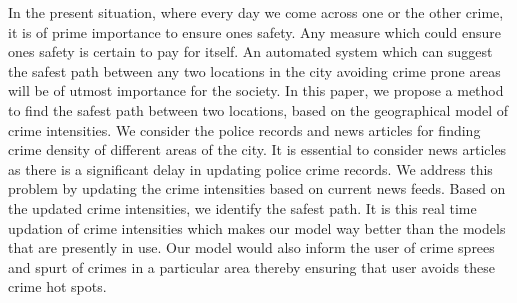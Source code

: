 In the present situation, where every day we come across one or the other crime, it is of prime importance to ensure ones safety. Any measure which could ensure ones safety is certain to pay for itself. An automated system which can suggest the safest path between any two locations in the city avoiding crime prone areas will be of utmost importance for the society. In this paper, we propose a method to find the safest path between two locations, based on the geographical model of crime intensities. We consider the police records and news articles for finding crime density of different areas of the city. It is essential to consider news articles as there is a significant delay in updating police crime records. We address this problem by updating the crime intensities based on current news feeds. Based on the updated crime intensities, we identify the safest path. It is this real time updation of crime intensities which makes our model way better than the models that are presently in use.  Our model would also inform the user of crime sprees and spurt of crimes in a particular area thereby ensuring that user avoids these crime hot spots.
